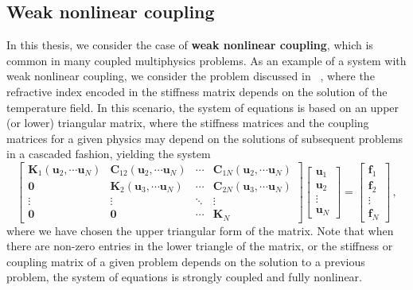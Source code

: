 \subsection*{Weak nonlinear coupling}


In this thesis, we consider the case of \textbf{weak nonlinear coupling},
 which is common in many
 coupled multiphysics problems. As an example of a system with weak nonlinear coupling, we consider the problem discussed in ~\cite{ownpub0}, where the refractive index encoded in 
 the stiffness matrix depends on the solution of the temperature field.
 In this scenario, the system of equations is based on an upper (or lower) triangular matrix, where the stiffness matrices and the coupling matrices for a given physics may depend 
 on the solutions of subsequent problems in a cascaded fashion, yielding the system
     \begin{equation} \label{eq:multiphysics_weak_nonlinear}
        \begin{bmatrix}
 \mathbf{K}_1(\mathbf{u}_2, \cdots \mathbf{u}_N)    & \mathbf{C}_{12} (\mathbf{u}_2, \cdots \mathbf{u}_N)& \cdots & \mathbf{C}_{1N}(\mathbf{u}_2, \cdots \mathbf{u}_N) \\
            \mathbf{0} & \mathbf{K}_2 (\mathbf{u}_3, \cdots \mathbf{u}_N)   & \cdots & \mathbf{C}_{2N} (\mathbf{u}_3, \cdots \mathbf{u}_N)\\
            \vdots          & \vdots          & \ddots & \vdots          \\
            \mathbf{0} & \mathbf{0} & \cdots & \mathbf{K}_N
        \end{bmatrix}
        \begin{bmatrix}
 \mathbf{u}_1 \\
 \mathbf{u}_2 \\
            \vdots       \\
 \mathbf{u}_N
        \end{bmatrix}
 =
        \begin{bmatrix}
 \mathbf{f}_1\\
 \mathbf{f}_2\\
            \vdots       \\
 \mathbf{f}_N
        \end{bmatrix}\,,
    \end{equation}
 where we have chosen the upper triangular form of the matrix.
 Note that when there are non-zero entries in the lower triangle of the matrix, or the stiffness or coupling matrix of a given problem depends on the solution to a previous problem, the system of equations is strongly coupled and fully nonlinear.

